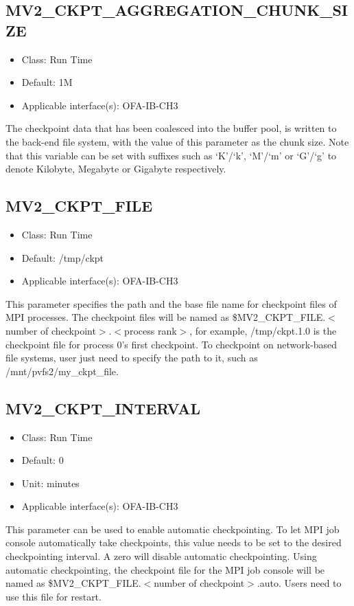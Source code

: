 \subsection{MV2\_CKPT\_AGGREGATION\_CHUNK\_SIZE}
\label{def:mv2_ckpt_aggregation_chunk_size}
\begin{itemize}
    \item Class: Run Time
    \item Default: 1M
    \item Applicable interface(s):  OFA-IB-CH3
\end{itemize}
The checkpoint data that has been coalesced into the buffer pool, is written to the back-end file system,
with the value of this parameter as the chunk size.
Note that this variable can be set with suffixes such as `K'/`k', `M'/`m' or `G'/`g'
to denote Kilobyte, Megabyte or Gigabyte respectively.


\subsection{MV2\_CKPT\_FILE}
\label{def:mv2-ckpt-file}
\begin{itemize}
    \item Class: Run Time
    \item Default: /tmp/ckpt
    \item Applicable interface(s): OFA-IB-CH3
\end{itemize}
This parameter specifies the path and the base file name for
checkpoint files of MPI processes. The checkpoint files will be
named as \${MV2\_CKPT\_FILE.$<$number of checkpoint$>$.$<$process rank$>$},
for example, /tmp/ckpt.1.0 is the checkpoint file for process 0's
first checkpoint. To checkpoint on network-based file systems, user
just need to specify the path to it, such as
/mnt/pvfs2/my\_ckpt\_file.

\subsection{MV2\_CKPT\_INTERVAL}
\label{def:mv2-ckpt-interval}
\begin{itemize}
    \item Class: Run Time
    \item Default: 0
    \item Unit: minutes
    \item Applicable interface(s): OFA-IB-CH3
\end{itemize}
This parameter can be used to enable automatic checkpointing. To let
MPI job console automatically take checkpoints, this value needs to
be set to the desired checkpointing interval. A zero will disable
automatic checkpointing. Using automatic checkpointing, the
checkpoint file for the MPI job console will be named as
\${MV2\_CKPT\_FILE.$<$number of checkpoint$>$.auto}. Users need to use
this file for restart.

